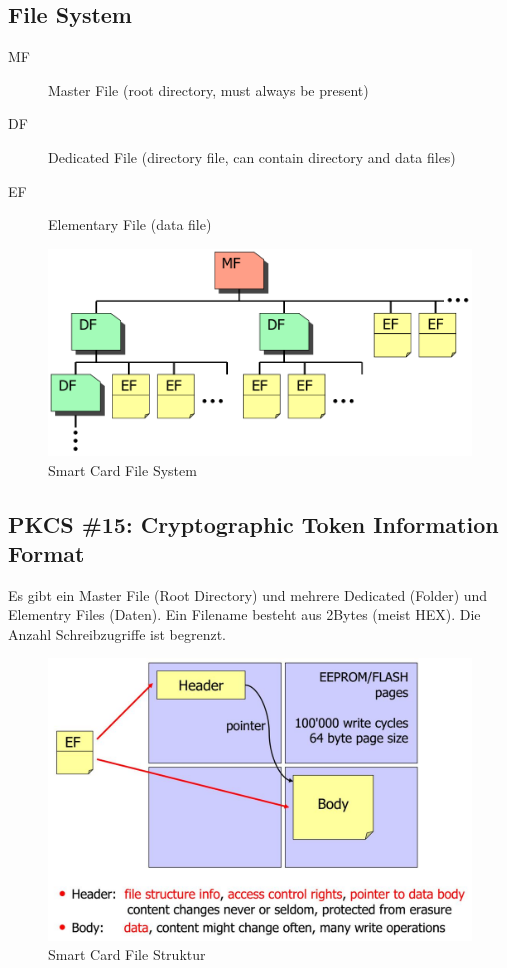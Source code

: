 \newpage

\subsection{File System}
\begin{description}
    \item[MF] Master File (root directory, must always be present)
    \item[DF] Dedicated File (directory file, can contain directory and data files)
    \item[EF] Elementary File (data file)
\end{description}
\begin{figure}[h]
\centering
\includegraphics[width=0.5\linewidth]{images/smart_card_file_system.png}
\caption{Smart Card File System}
\label{fig:smartcardfilesystem}
\end{figure}

\subsection{PKCS \#15: Cryptographic Token Information Format}
Es gibt ein Master File (Root Directory) und mehrere Dedicated (Folder) und Elementry Files (Daten). Ein Filename besteht aus 2Bytes (meist HEX). Die Anzahl Schreibzugriffe ist begrenzt. 

\begin{figure}[h]
\centering
\includegraphics[width=0.5\linewidth]{images/smart_card_file_structure}
\caption{Smart Card File Struktur}
\label{fig:smartcardfilestructure}
\end{figure}

